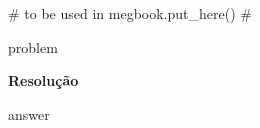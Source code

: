 {# to be used in megbook.put_here() #}


%
%

{{ problem }}

\noindent\textbf{Resolução}

{{ answer }}




